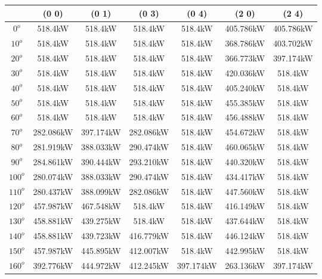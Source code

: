         \singlespacing
        \begin{table}[H]
        	\centering
        	\begin{tabular}{|c|c|c|c|c|c|c|} \hline
        			& (0 0)		& (0 1)		& (0 3)		& (0 4)		& (2 0)		& (2 4)		\\ \hline
        		$0^o$	& 518.4kW	& 518.4kW	& 518.4kW	& 518.4kW	& 405.786kW	& 405.786kW	\\ \hline
        		$10^o$	& 518.4kW	& 518.4kW	& 518.4kW	& 518.4kW	& 368.786kW	& 403.702kW	\\ \hline
        		$20^o$	& 518.4kW	& 518.4kW	& 518.4kW	& 518.4kW	& 366.773kW	& 397.174kW	\\ \hline
        		$30^o$	& 518.4kW	& 518.4kW	& 518.4kW	& 518.4kW	& 420.036kW	& 518.4kW	\\ \hline
        		$40^o$	& 518.4kW	& 518.4kW	& 518.4kW	& 518.4kW	& 405.240kW	& 518.4kW	\\ \hline
        		$50^o$	& 518.4kW	& 518.4kW	& 518.4kW	& 518.4kW	& 455.385kW	& 518.4kW	\\ \hline
        		$60^o$	& 518.4kW	& 518.4kW	& 518.4kW	& 518.4kW	& 456.488kW	& 518.4kW	\\ \hline
        		$70^o$	& 282.086kW	& 397.174kW	& 282.086kW	& 518.4kW	& 454.672kW	& 518.4kW	\\ \hline
        		$80^o$	& 281.919kW	& 388.033kW	& 290.474kW	& 518.4kW	& 460.065kW	& 518.4kW	\\ \hline
        		$90^o$	& 284.861kW	& 390.444kW	& 293.210kW	& 518.4kW	& 440.320kW	& 518.4kW	\\ \hline
        		$100^o$	& 280.074kW	& 388.033kW	& 290.474kW	& 518.4kW	& 434.417kW	& 518.4kW	\\ \hline
        		$110^o$	& 280.437kW	& 388.099kW	& 282.086kW	& 518.4kW	& 447.560kW	& 518.4kW	\\ \hline
        		$120^o$	& 457.987kW	& 467.548kW	& 518.4kW	& 518.4kW	& 416.149kW	& 518.4kW	\\ \hline
        		$130^o$	& 458.881kW	& 439.275kW	& 518.4kW	& 518.4kW	& 437.644kW	& 518.4kW	\\ \hline
        		$140^o$	& 458.881kW	& 439.723kW	& 416.779kW	& 518.4kW	& 446.124kW	& 518.4kW	\\ \hline
        		$150^o$	& 457.987kW	& 445.895kW	& 412.007kW	& 518.4kW	& 442.995kW	& 518.4kW	\\ \hline
        		$160^o$	& 392.776kW	& 444.972kW	& 412.245kW	& 397.174kW	& 263.136kW	& 397.174kW	\\ \hline

\end{tabular}
\end{table}
